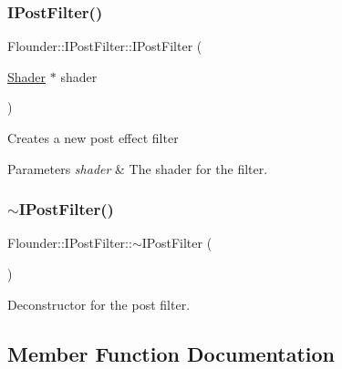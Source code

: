 \subsubsection{\texorpdfstring{I\+Post\+Filter()}{IPostFilter()}\hspace{0.1cm}{\footnotesize\ttfamily [3/3]}}
{\footnotesize\ttfamily Flounder\+::\+I\+Post\+Filter\+::\+I\+Post\+Filter (\begin{DoxyParamCaption}\item[{\hyperlink{class_flounder_1_1_shader}{Shader} $\ast$}]{shader }\end{DoxyParamCaption})}



Creates a new post effect filter 


\begin{DoxyParams}{Parameters}
{\em shader} & The shader for the filter. \\
\hline
\end{DoxyParams}
\mbox{\label{class_flounder_1_1_i_post_filter_a2aed88c344d7357253b85e107f92bd59}} 
\subsubsection{\texorpdfstring{$\sim$\+I\+Post\+Filter()}{~IPostFilter()}}
{\footnotesize\ttfamily Flounder\+::\+I\+Post\+Filter\+::$\sim$\+I\+Post\+Filter (\begin{DoxyParamCaption}{ }\end{DoxyParamCaption})\hspace{0.3cm}{\ttfamily [virtual]}}



Deconstructor for the post filter. 



\subsection{Member Function Documentation}
\mbox{\label{class_flounder_1_1_i_post_filter_a81ba69d6b7e70d120db82b9e8ed6a22a}} 
